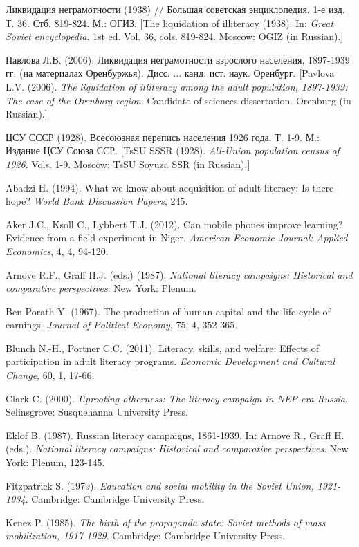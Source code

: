 \documentclass[12pt]{article}
\begin{document}
\begin{singlespace}
\begin{list}{}{\setlength{\leftmargin}{1.5em}\setlength{\itemindent}{-1.5em}\setlength{\itemsep}{2pt}\setlength{\parsep}{0pt}}
\item Ликвидация неграмотности (1938) // Большая советская энциклопедия. 1-е изд. Т. 36. Стб. 819-824. М.: ОГИЗ. [The liquidation of illiteracy (1938). In: \textit{Great Soviet encyclopedia}. 1st ed. Vol. 36, cols. 819-824. Moscow: OGIZ (in Russian).]
\item Павлова Л.В. (2006). Ликвидация неграмотности взрослого населения, 1897-1939 гг. (на материалах Оренбуржья). Дисс. ... канд. ист. наук. Оренбург. [Pavlova L.V. (2006). \textit{The liquidation of illiteracy among the adult population, 1897-1939: The case of the Orenburg region}. Candidate of sciences dissertation. Orenburg (in Russian).]
\item ЦСУ СССР (1928). Всесоюзная перепись населения 1926 года. Т. 1-9. М.: Издание ЦСУ Союза ССР. [TsSU SSSR (1928). \textit{All-Union population census of 1926}. Vols. 1-9. Moscow: TsSU Soyuza SSR (in Russian).]
\item Abadzi H. (1994). What we know about acquisition of adult literacy: Is there hope? \textit{World Bank Discussion Papers}, 245.
\item Aker J.C., Ksoll C., Lybbert T.J. (2012). Can mobile phones improve learning? Evidence from a field experiment in Niger. \textit{American Economic Journal: Applied Economics}, 4, 4, 94-120.
\item Arnove R.F., Graff H.J. (eds.) (1987). \textit{National literacy campaigns: Historical and comparative perspectives}. New York: Plenum.
\item Ben-Porath Y. (1967). The production of human capital and the life cycle of earnings. \textit{Journal of Political Economy}, 75, 4, 352-365.
\item Blunch N.-H., Pörtner C.C. (2011). Literacy, skills, and welfare: Effects of participation in adult literacy programs. \textit{Economic Development and Cultural Change}, 60, 1, 17-66.
\item Clark C. (2000). \textit{Uprooting otherness: The literacy campaign in NEP-era Russia}. Selinsgrove: Susquehanna University Press.
\item Eklof B. (1987). Russian literacy campaigns, 1861-1939. In: Arnove R., Graff H. (eds.). \textit{National literacy campaigns: Historical and comparative perspectives}. New York: Plenum, 123-145.
\item Fitzpatrick S. (1979). \textit{Education and social mobility in the Soviet Union, 1921-1934}. Cambridge: Cambridge University Press.
\item Kenez P. (1985). \textit{The birth of the propaganda state: Soviet methods of mass mobilization, 1917-1929}. Cambridge: Cambridge University Press.

\end{list}
\end{singlespace}
\end{document}
